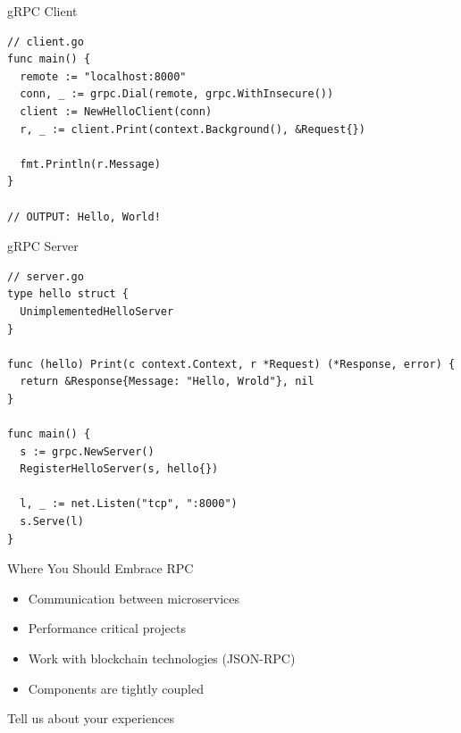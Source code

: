 \documentclass[xcolor={rgb}]{beamer}
\newcommand{\pitem}{\pause \item}
\newcounter{_i}
\begin{document}
\begin{frame}[fragile]{gRPC Client}
  \begin{verbatim}
// client.go
func main() {
  remote := "localhost:8000"
  conn, _ := grpc.Dial(remote, grpc.WithInsecure())
  client := NewHelloClient(conn)
  r, _ := client.Print(context.Background(), &Request{})

  fmt.Println(r.Message)
}

// OUTPUT: Hello, World!
  \end{verbatim}
\end{frame}

\begin{frame}[fragile]{gRPC Server}
  \begin{verbatim}
// server.go
type hello struct {
  UnimplementedHelloServer
}

func (hello) Print(c context.Context, r *Request) (*Response, error) {
  return &Response{Message: "Hello, Wrold"}, nil
}

func main() {
  s := grpc.NewServer()
  RegisterHelloServer(s, hello{})

  l, _ := net.Listen("tcp", ":8000")
  s.Serve(l)
}
  \end{verbatim}
\end{frame}

\begin{frame}[fragile]{Where You Should Embrace RPC}
  \begin{itemize}
    \pitem Communication between microservices
    \pitem Performance critical projects
    \pitem Work with blockchain technologies (JSON-RPC)
    \pitem Components are tightly coupled
  \end{itemize}
\end{frame}

\begin{frame}
  \vfill
  \begin{center}
    \Huge Tell us about your experiences
  \end{center}
  \vfill
\end{frame}
\end{document}
